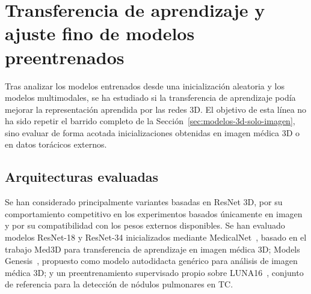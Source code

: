 


\section{Transferencia de aprendizaje y ajuste fino de modelos preentrenados}\label{sec:dl-preentrenamiento}

Tras analizar los modelos entrenados desde una inicialización aleatoria y los modelos multimodales, se ha estudiado si la transferencia de aprendizaje podía mejorar la representación aprendida por las redes 3D. El objetivo de esta línea no ha sido repetir el barrido completo de la Sección~\ref{sec:modelos-3d-solo-imagen}, sino evaluar de forma acotada inicializaciones obtenidas en imagen médica 3D o en datos torácicos externos.

\subsection{Arquitecturas evaluadas}

Se han considerado principalmente variantes basadas en ResNet 3D, por su comportamiento competitivo en los experimentos basados únicamente en imagen y por su compatibilidad con los pesos externos disponibles. Se han evaluado modelos ResNet-18 y ResNet-34 inicializados mediante MedicalNet~\cite{chen2019med3d}, basado en el trabajo Med3D para transferencia de aprendizaje en imagen médica 3D; Models Genesis~\cite{zhou2019models}, propuesto como modelo autodidacta genérico para análisis de imagen médica 3D; y un preentrenamiento supervisado propio sobre LUNA16~\cite{Setio2017}, conjunto de referencia para la detección de nódulos pulmonares en TC.

